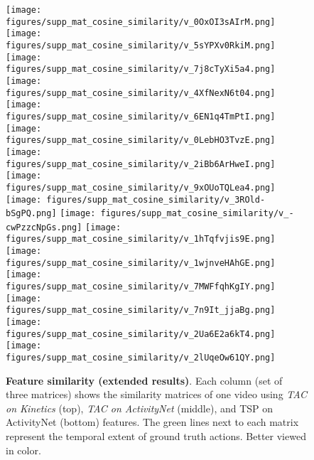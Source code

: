 \documentclass[10pt,twocolumn,letterpaper]{article}
\begin{document}
\begin{figure*}[t]
    \texttt{[image: figures/supp\_mat\_cosine\_similarity/v\_0OxOI3sAIrM.png]}
    \texttt{[image: figures/supp\_mat\_cosine\_similarity/v\_5sYPXv0RkiM.png]}    
    \texttt{[image: figures/supp\_mat\_cosine\_similarity/v\_7j8cTyXi5a4.png]}
    \texttt{[image: figures/supp\_mat\_cosine\_similarity/v\_4XfNexN6t04.png]}
    \texttt{[image: figures/supp\_mat\_cosine\_similarity/v\_6EN1q4TmPtI.png]}
    \texttt{[image: figures/supp\_mat\_cosine\_similarity/v\_0LebHO3TvzE.png]}
    \texttt{[image: figures/supp\_mat\_cosine\_similarity/v\_2iBb6ArHweI.png]}
    \texttt{[image: figures/supp\_mat\_cosine\_similarity/v\_9xOUoTQLea4.png]}\\
    \texttt{[image: figures/supp\_mat\_cosine\_similarity/v\_3ROld-bSgPQ.png]}
    \texttt{[image: figures/supp\_mat\_cosine\_similarity/v\_-cwPzzcNpGs.png]}
    \texttt{[image: figures/supp\_mat\_cosine\_similarity/v\_1hTqfvjis9E.png]}
    \texttt{[image: figures/supp\_mat\_cosine\_similarity/v\_1wjnveHAhGE.png]}
    \texttt{[image: figures/supp\_mat\_cosine\_similarity/v\_7MWFfqhKgIY.png]}
    \texttt{[image: figures/supp\_mat\_cosine\_similarity/v\_7n9It\_jjaBg.png]}
    \texttt{[image: figures/supp\_mat\_cosine\_similarity/v\_2Ua6E2a6kT4.png]}
    \texttt{[image: figures/supp\_mat\_cosine\_similarity/v\_2lUqeOw61QY.png]}
    \\
    \vspace{-5pt}
    \caption{\textbf{Feature similarity (extended results)}. Each column  (set of three matrices) shows the similarity matrices of one video using \textit{TAC on Kinetics} (top), \textit{TAC on ActivityNet} (middle), and TSP on ActivityNet (bottom) features. The green lines next to each matrix represent the temporal extent of ground truth actions. Better viewed in color.}
    \vspace{-5pt}
    \label{fig:supp_mat_cosine_similarity}
\end{figure*}
 
\end{document}
